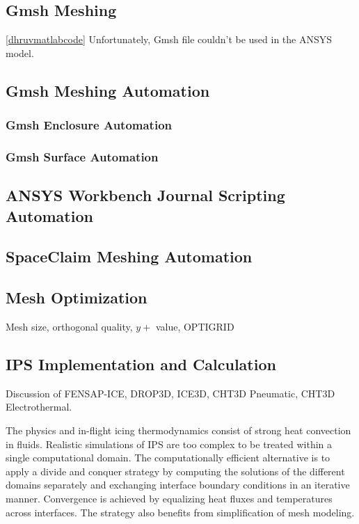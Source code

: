 \documentclass[english]{kththesis}
\begin{document}
\subsection{Gmsh Meshing} \ref{dhruvmatlabcode} Unfortunately, Gmsh file couldn't be used in the ANSYS model.
\subsection{Gmsh Meshing Automation} \label{subsec:gmsh_mesh}
\subsubsection{Gmsh Enclosure Automation}
\subsubsection{Gmsh Surface Automation}
\subsection{ANSYS Workbench Journal Scripting Automation}
\subsection{SpaceClaim Meshing Automation}
\subsection{Mesh Optimization} Mesh size, orthogonal quality, $y+$ value, OPTIGRID

\subsection{IPS Implementation and Calculation}
Discussion of FENSAP-ICE, DROP3D, ICE3D, CHT3D Pneumatic, CHT3D Electrothermal.

The physics and in-flight icing thermodynamics consist of strong heat convection in fluids. Realistic simulations of IPS are too complex to be treated within a single computational domain. The computationally efficient alternative is to apply a divide and conquer strategy by computing the solutions of the different domains separately and exchanging interface boundary conditions in an iterative manner. Convergence is achieved by equalizing heat fluxes and temperatures across interfaces. The strategy also benefits from simplification of mesh modeling.
\cleardoublepage
\end{document}
